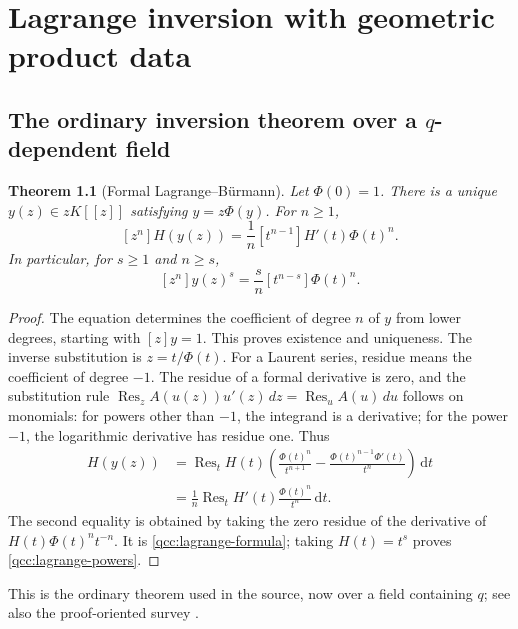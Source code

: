 \documentclass[11pt,a4paper,oneside,openany]{book}
\newtheorem{theorem}{Theorem}[chapter]
\theoremstyle{definition}
\theoremstyle{remark}
\DeclareMathOperator{\Res}{Res}
\newcommand{\dd}{\,\mathrm d}
\newcommand{\qbname}{\texorpdfstring{$q$}{q}}
\begin{document}
\chapter{Lagrange inversion with geometric product data}
\label{qcc:lagrange}
\section{The ordinary inversion theorem over a \qbname-dependent field}
\begin{theorem}[Formal Lagrange--B\"urmann]\label{qcc:lagrange-theorem}
Let \(\Phi(0)=1\). There is a unique \(y(z)\in zK[[z]]\) satisfying
\(y=z\Phi(y)\). For \(n\ge1\),
\begin{equation}\label{qcc:lagrange-formula}
 [z^n]H(y(z))=\frac1n[t^{n-1}]H'(t)\Phi(t)^n.
\end{equation}
In particular, for \(s\ge1\) and \(n\ge s\),
\begin{equation}\label{qcc:lagrange-powers}
 [z^n]y(z)^s=\frac{s}{n}[t^{n-s}]\Phi(t)^n.
\end{equation}
\end{theorem}
\begin{proof}
The equation determines the coefficient of degree \(n\) of \(y\) from lower
degrees, starting with \([z]y=1\). This proves existence and uniqueness.
The inverse substitution is \(z=t/\Phi(t)\).
For a Laurent series, residue means the coefficient of degree \(-1\).
The residue of a formal derivative is zero, and the substitution rule
\(\Res_z A(u(z))u'(z)\,dz=\Res_u A(u)\,du\) follows on monomials:
for powers other than \(-1\), the integrand is a derivative; for the power
\(-1\), the logarithmic derivative has residue one.
Thus
\begin{align*}
 [z^n]H(y(z))
 &=\Res_t H(t)\left(\frac{\Phi(t)^n}{t^{n+1}}
                   -\frac{\Phi(t)^{n-1}\Phi'(t)}{t^n}\right)\dd t\\
 &=\frac1n\Res_t H'(t)\frac{\Phi(t)^n}{t^n}\dd t.
\end{align*}
The second equality is obtained by taking the zero residue of the derivative
of \(H(t)\Phi(t)^nt^{-n}\). It is \eqref{qcc:lagrange-formula}; taking
\(H(t)=t^s\) proves \eqref{qcc:lagrange-powers}.
\end{proof}
This is the ordinary theorem used in the source, now over a field containing
\(q\); see also the proof-oriented survey \cite{gessel}.
\end{document}
